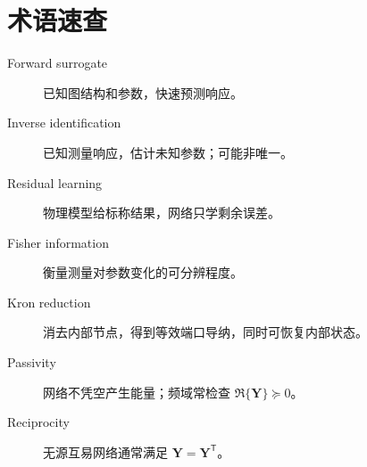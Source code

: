 \documentclass[UTF8,11pt,a4paper]{ctexart}
\newcommand{\mat}[1]{\bm{#1}}
\begin{document}
\section{术语速查}
\begin{description}
\item[Forward surrogate] 已知图结构和参数，快速预测响应。
\item[Inverse identification] 已知测量响应，估计未知参数；可能非唯一。
\item[Residual learning] 物理模型给标称结果，网络只学剩余误差。
\item[Fisher information] 衡量测量对参数变化的可分辨程度。
\item[Kron reduction] 消去内部节点，得到等效端口导纳，同时可恢复内部状态。
\item[Passivity] 网络不凭空产生能量；频域常检查 $\Re\{\mat Y\}\succeq0$。
\item[Reciprocity] 无源互易网络通常满足 $\mat Y=\mat Y^{\mathsf T}$。
\end{description}
\end{document}
